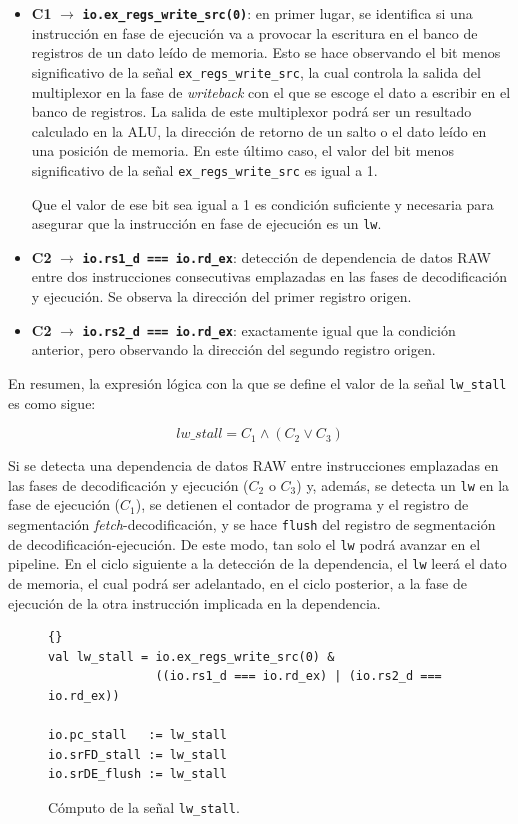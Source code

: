 \begin{itemize}
  \item \textbf{C1} $\rightarrow$ \textbf{\texttt{io.ex\_regs\_write\_src(0)}}: en primer lugar, se identifica si una instrucción en fase de ejecución va a provocar la escritura en el banco de registros de un dato leído de memoria. Esto se hace observando el bit menos significativo de la señal \texttt{ex\_regs\_write\_src}, la cual controla la salida del multiplexor en la fase de \textit{writeback} con el que se escoge el dato a escribir en el banco de registros. La salida de este multiplexor podrá ser un resultado calculado en la ALU, la dirección de retorno de un salto o el dato leído en una posición de memoria. En este último caso, el valor del bit menos significativo de la señal \texttt{ex\_regs\_write\_src} es igual a 1.
  
  Que el valor de ese bit sea igual a 1 es condición suficiente y necesaria para asegurar que la instrucción en fase de ejecución es un \texttt{lw}.
  \item \textbf{C2} $\rightarrow$ \textbf{\texttt{io.rs1\_d === io.rd\_ex}}: detección de dependencia de datos RAW entre dos instrucciones consecutivas emplazadas en las fases de decodificación y ejecución. Se observa la dirección del primer registro origen.
  \item \textbf{C2} $\rightarrow$ \textbf{\texttt{io.rs2\_d === io.rd\_ex}}: exactamente igual que la condición anterior, pero observando la dirección del segundo registro origen.
\end{itemize}

En resumen, la expresión lógica con la que se define el valor de la señal \texttt{lw\_stall} es como sigue:

\[
\textit{lw\_stall} = C_1 \land (C_2 \lor C_3)
\]

Si se detecta una dependencia de datos RAW entre instrucciones emplazadas en las fases de decodificación y ejecución ($C_2$ o $C_3$) y, además, se detecta un \texttt{lw} en la fase de ejecución ($C_1$), se detienen el contador de programa y el registro de segmentación \textit{fetch}-decodificación, y se hace \texttt{flush} del registro de segmentación de decodificación-ejecución. De este modo, tan solo el \texttt{lw} podrá avanzar en el pipeline. En el ciclo siguiente a la detección de la dependencia, el \texttt{lw} leerá el dato de memoria, el cual podrá ser adelantado, en el ciclo posterior, a la fase de ejecución de la otra instrucción implicada en la dependencia.

\vspace{+0.4cm}
\begin{figure}[h!]
\begin{lstlisting}[style=scalaStyle,columns=fullflexible]{}
val lw_stall = io.ex_regs_write_src(0) &
               ((io.rs1_d === io.rd_ex) | (io.rs2_d === io.rd_ex))

io.pc_stall   := lw_stall
io.srFD_stall := lw_stall
io.srDE_flush := lw_stall
\end{lstlisting}
\vspace{-0.1cm}
\caption{Cómputo de la señal \texttt{lw\_stall}.}
\end{figure}

